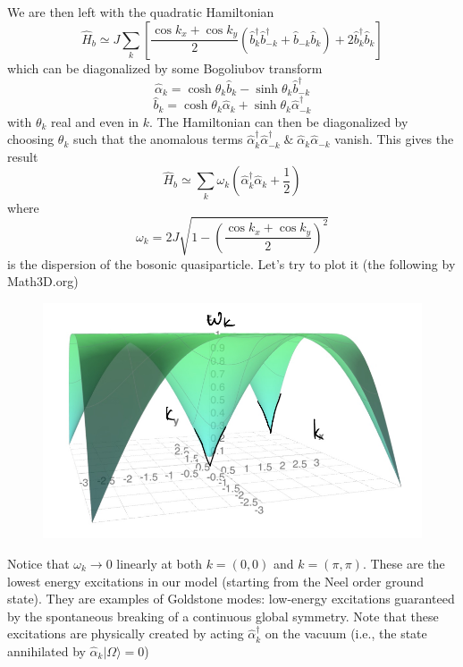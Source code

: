We are then left with the quadratic Hamiltonian
\[ \hat{H}_b\simeq J\sum_k{\left[ \frac{\cos k_x+\cos k_y}{2}\left( \hat{b}_{k}^{\dagger}\hat{b}_{-k}^{\dagger}+\hat{b}_{-k}\hat{b}_k \right) +2\hat{b}_{k}^{\dagger}\hat{b}_k \right]}\]
which can be diagonalized by some Bogoliubov transform
\[ \hat{\alpha}_k=\cosh \theta _k\hat{b}_k-\sinh \theta _k\hat{b}_{-k}^{\dagger}\]
\[ \hat{b}_k=\cosh \theta _k\hat{\alpha}_k+\sinh \theta _k\hat{\alpha}_{-k}^{\dagger}\]
with $\theta_k$ real and even in $k$. The Hamiltonian can then be diagonalized by choosing $\theta_k$ such that the anomalous terms $\hat{\alpha}_{k}^{\dagger}\hat{\alpha}_{-k}^{\dagger}\;\&\;\hat{\alpha}_k\hat{\alpha}_{-k}$ vanish. This gives the result
\[ \hat{H}_b\simeq \sum_k{\omega _k\left( \hat{\alpha}_{k}^{\dagger}\hat{\alpha}_k+\frac{1}{2} \right)}\]
where
\[ \omega _k=2J\sqrt{1-\left( \frac{\cos k_x+\cos k_y}{2} \right) ^2}\]
is the dispersion of the bosonic quasiparticle. Let's try to plot it (the following by Math3D.org)
\begin{figure}[H]
    \centering
    \includegraphics[width=\textwidth]{jupyterbook/data/fig/lec25-fig06.png}
\end{figure}
Notice that $\omega_k\to 0$ linearly at both $k=(0,0)$ and $k=(\pi,\pi)$. These are the lowest energy excitations in our model (starting from the Neel order ground state). They are examples of Goldstone modes: low-energy excitations guaranteed by the spontaneous breaking of a continuous global symmetry. Note that these excitations are physically created by acting $\hat{\alpha}_k^\dagger$ on the vacuum (i.e., the state annihilated by $\hat{\alpha}_k|\Omega \rangle =0$)

